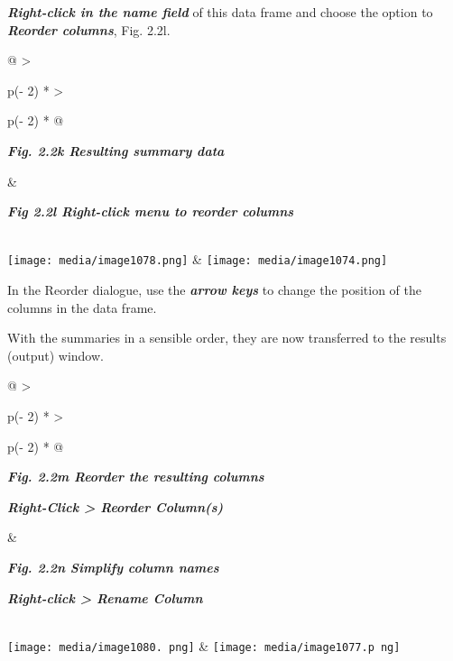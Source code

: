\documentclass[
  letterpaper,
  DIV=11,
  numbers=noendperiod]{scrreprt}
\begin{document}
\textbf{\emph{Right-click in the name field}} of this data frame and
choose the option to \textbf{\emph{Reorder columns}}, Fig. 2.2l.

\begin{longtable}[]{@{}
  >{\raggedright\arraybackslash}p{(\columnwidth - 2\tabcolsep) * }
  >{\raggedright\arraybackslash}p{(\columnwidth - 2\tabcolsep) * }@{}}
\toprule\noalign{}
\begin{minipage}[b]{\linewidth}\raggedright
\textbf{\emph{Fig. 2.2k Resulting summary data}}
\end{minipage} & \begin{minipage}[b]{\linewidth}\raggedright
\textbf{\emph{Fig 2.2l Right-click menu to reorder columns}}
\end{minipage} \\
\midrule\noalign{}
\endhead
\bottomrule\noalign{}
\endlastfoot
\texttt{[image: media/image1078.png]}
&
\texttt{[image: media/image1074.png]} \\
\end{longtable}

In the Reorder dialogue, use the \textbf{\emph{arrow keys}} to change
the position of the columns in the data frame.

With the summaries in a sensible order, they are now transferred to the
results (output) window.

\begin{longtable}[]{@{}
  >{\raggedright\arraybackslash}p{(\columnwidth - 2\tabcolsep) * }
  >{\raggedright\arraybackslash}p{(\columnwidth - 2\tabcolsep) * }@{}}
\toprule\noalign{}
\begin{minipage}[b]{\linewidth}\raggedright
\textbf{\emph{Fig. 2.2m Reorder the resulting columns}}

\textbf{\emph{Right-Click \textgreater{} Reorder Column(s)}}
\end{minipage} & \begin{minipage}[b]{\linewidth}\raggedright
\textbf{\emph{Fig. 2.2n Simplify column names}}

\textbf{\emph{Right-click \textgreater{} Rename Column}}
\end{minipage} \\
\midrule\noalign{}
\endhead
\bottomrule\noalign{}
\endlastfoot
\texttt{[image: media/image1080. png]}
&
\texttt{[image: media/image1077.p ng]} \\
\end{longtable}
\end{document}
